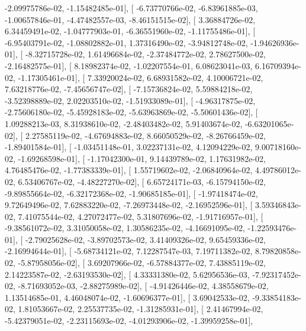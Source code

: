 \documentclass{article}
\begin{document}
         -2.09975786e-02,  -1.15482485e-01],
       [ -6.73770766e-02,  -6.83961885e-03,  -1.00657846e-01,
         -4.47482557e-03,  -8.46151515e-02],
       [  3.36884726e-02,   6.34459491e-02,  -1.04777903e-01,
         -6.36551960e-02,  -1.11755486e-01],
       [ -6.95403791e-02,  -1.08802882e-01,   1.37316490e-02,
         -3.94812748e-02,  -1.94626936e-01],
       [ -8.32715728e-02,   1.61496684e-02,  -2.37484772e-02,
          2.78627500e-02,  -2.16482575e-01],
       [  8.18982374e-02,  -1.02207554e-01,   6.08623041e-03,
          6.16709394e-02,  -1.17305461e-01],
       [  7.33920024e-02,   6.68931582e-02,   4.10006721e-02,
          7.63218776e-02,  -7.45656747e-02],
       [ -7.15736824e-02,   5.59884218e-02,  -3.52398889e-02,
          2.02203510e-02,  -1.51933089e-01],
       [ -4.96317875e-02,  -2.75606180e-02,  -5.45928183e-02,
         -5.63963869e-02,  -5.50601436e-02],
       [  1.09288213e-03,   8.31938610e-02,  -2.48403482e-02,
          5.91403674e-02,  -6.63201065e-02],
       [  2.27585119e-02,  -4.67694883e-02,   8.66050529e-02,
         -8.26766459e-02,  -1.89401584e-01],
       [ -1.03451148e-01,   3.02237131e-02,   4.12094229e-02,
          9.00718160e-02,  -1.69268598e-01],
       [ -1.17042300e-01,   9.14439789e-02,   1.17631982e-02,
          4.76485476e-02,  -1.77383339e-01],
       [  1.55719602e-02,  -2.06840964e-02,   4.49786012e-02,
          6.53406767e-02,  -4.48227270e-02],
       [  6.65724171e-03,  -6.15794150e-02,  -9.89855664e-02,
         -6.32172368e-02,  -1.90685185e-01],
       [ -1.97418474e-02,   9.72649496e-02,   7.62883220e-02,
         -7.26973448e-02,  -2.16952596e-01],
       [  3.59346843e-02,   7.41075544e-02,   4.27072477e-02,
          5.31807696e-02,  -1.91716957e-01],
       [ -9.38561072e-02,   3.31050058e-02,   1.30586235e-02,
         -4.16691095e-02,  -1.22593476e-01],
       [ -2.79025628e-02,  -3.89702573e-02,   3.41409326e-02,
          9.65459336e-02,  -2.16994644e-01],
       [ -5.68734121e-02,   7.12287547e-03,   7.19711382e-02,
          8.79820858e-02,  -5.87958056e-02],
       [  3.69207966e-02,  -6.57884377e-02,   7.43885119e-02,
          2.14223587e-02,  -2.63193530e-02],
       [  4.33331380e-02,   5.62956536e-03,  -7.92317452e-02,
         -8.71693052e-03,  -2.88275989e-02],
       [ -4.91426446e-02,   4.38558679e-02,   1.13514685e-01,
          4.46048074e-02,  -1.60696377e-01],
       [  3.69042533e-02,  -9.33854183e-02,   1.81053667e-02,
          2.25537735e-02,  -1.31285931e-01],
       [  2.41467994e-02,  -5.42379051e-02,  -2.23115693e-02,
         -4.01293906e-02,  -1.39959258e-01],
\end{document}
